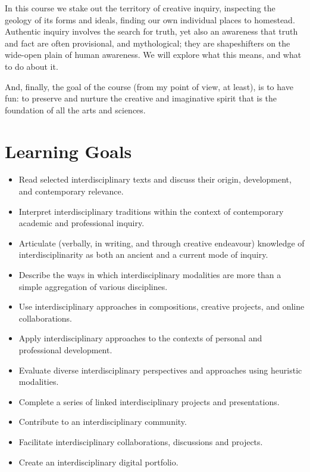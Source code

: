 \documentclass[letterpaper,10pt,headsepline]{scrreprt}
\begin{document}
In this course we stake out the territory of creative inquiry, inspecting the geology of its forms and ideals, finding our own individual places to homestead. Authentic inquiry involves the search for truth, yet also an awareness that truth and fact are often provisional, and mythological; they are shapeshifters on the wide-open plain of human awareness. We will explore what this means, and what to do about it.

And, finally, the goal of the course (from my point of view, at least), is to have fun: to preserve and nurture the creative and imaginative spirit that is the foundation of all the arts and sciences.

\section{Learning Goals}
\begin{itemize}

\item Read selected interdisciplinary texts and discuss their origin, development, and contemporary relevance.
\item Interpret interdisciplinary traditions within the context of contemporary academic and professional inquiry.
\item Articulate (verbally, in writing, and through creative endeavour) knowledge of interdisciplinarity as both an ancient and a current mode of inquiry.
\item Describe the ways in which interdisciplinary modalities are more than a simple aggregation of various disciplines.
\item Use interdisciplinary approaches in compositions, creative projects, and online collaborations.
\item Apply interdisciplinary approaches to the contexts of personal and professional development.
\item Evaluate diverse interdisciplinary perspectives and approaches using heuristic modalities.
\item Complete a series of linked interdisciplinary projects and presentations.
\item Contribute to an interdisciplinary community.
\item Facilitate interdisciplinary collaborations, discussions and projects.
\item Create an interdisciplinary digital portfolio.

\end{itemize}
\end{document}
